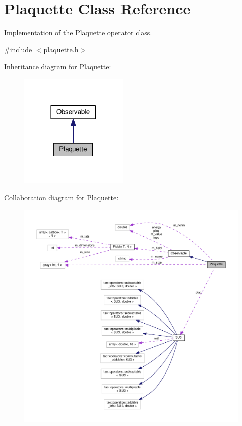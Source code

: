 \hypertarget{classPlaquette}{}\section{Plaquette Class Reference}
\label{classPlaquette}


Implementation of the \hyperlink{classPlaquette}{Plaquette} operator class.  




{\ttfamily \#include $<$plaquette.\+h$>$}



Inheritance diagram for Plaquette\+:\nopagebreak
\begin{figure}[H]
\begin{center}
\leavevmode
\includegraphics[width=146pt]{db/d05/classPlaquette__inherit__graph}
\end{center}
\end{figure}


Collaboration diagram for Plaquette\+:\nopagebreak
\begin{figure}[H]
\begin{center}
\leavevmode
\includegraphics[width=350pt]{d0/d3a/classPlaquette__coll__graph}
\end{center}
\end{figure}
